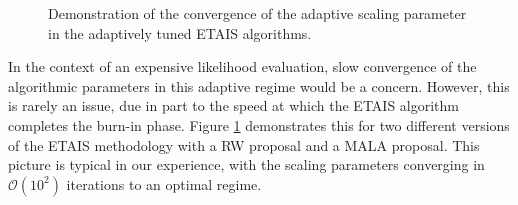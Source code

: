 \documentclass[final]{siamltex}
\begin{document}
\begin{figure}[!htb]
\centering
{}
\caption{Demonstration of the convergence of the adaptive scaling parameter in the adaptively tuned ETAIS algorithms.}
\label{fig:G1_adapt_trace_ETAIS}
\end{figure}

In the context of an expensive likelihood evaluation, slow convergence
of the algorithmic parameters in this adaptive regime would be a
concern. However, this is rarely an issue, due in part to the speed at
which the ETAIS algorithm completes the burn-in phase. Figure
\ref{fig:G1_adapt_trace_ETAIS} demonstrates this for two different
versions of the ETAIS methodology with a RW proposal and a MALA\cite{roberts1998optimal}
proposal. This picture is typical in our experience, with the scaling
parameters converging in $\mathcal{O}(10^2)$ iterations to an optimal regime.
\end{document}
